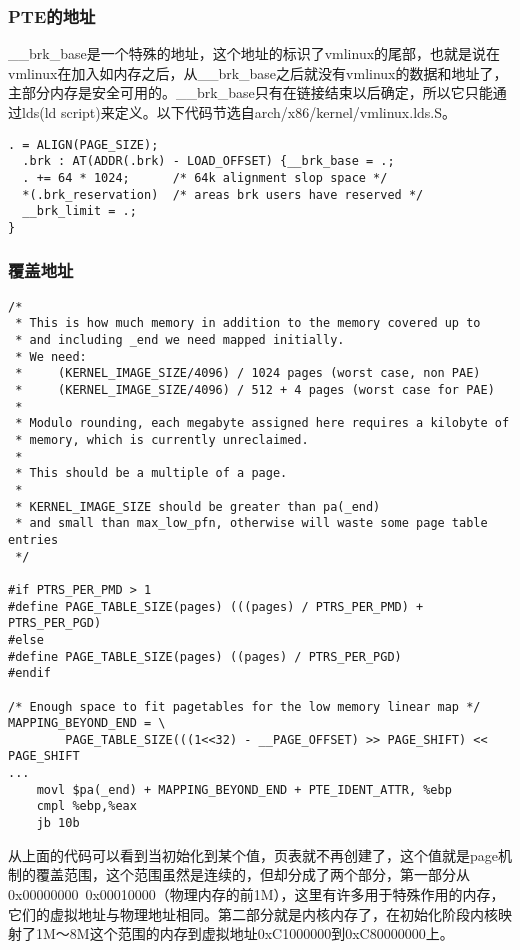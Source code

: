 \documentclass[b5paper,9pt,twoside,openany]{article}
\begin{document}
\subsubsection{PTE的地址}
\_\_brk\_base是一个特殊的地址，这个地址的标识了vmlinux的尾部，也就是说在vmlinux在加入如内存之后，从\_\_brk\_base之后就没有vmlinux的数据和地址了，主部分内存是安全可用的。\_\_brk\_base只有在链接结束以后确定，所以它只能通过lds(ld script)来定义。以下代码节选自arch/x86/kernel/vmlinux.lds.S。
\begin{lstlisting}
. = ALIGN(PAGE_SIZE);
  .brk : AT(ADDR(.brk) - LOAD_OFFSET) {__brk_base = .;
  . += 64 * 1024;      /* 64k alignment slop space */
  *(.brk_reservation)  /* areas brk users have reserved */
  __brk_limit = .;
}
\end{lstlisting}

\subsubsection{覆盖地址}
\begin{lstlisting}
/*
 * This is how much memory in addition to the memory covered up to
 * and including _end we need mapped initially.
 * We need:
 *     (KERNEL_IMAGE_SIZE/4096) / 1024 pages (worst case, non PAE)
 *     (KERNEL_IMAGE_SIZE/4096) / 512 + 4 pages (worst case for PAE)
 *
 * Modulo rounding, each megabyte assigned here requires a kilobyte of
 * memory, which is currently unreclaimed.
 *
 * This should be a multiple of a page.
 *
 * KERNEL_IMAGE_SIZE should be greater than pa(_end)
 * and small than max_low_pfn, otherwise will waste some page table entries
 */

#if PTRS_PER_PMD > 1
#define PAGE_TABLE_SIZE(pages) (((pages) / PTRS_PER_PMD) + PTRS_PER_PGD)
#else
#define PAGE_TABLE_SIZE(pages) ((pages) / PTRS_PER_PGD)
#endif

/* Enough space to fit pagetables for the low memory linear map */
MAPPING_BEYOND_END = \
        PAGE_TABLE_SIZE(((1<<32) - __PAGE_OFFSET) >> PAGE_SHIFT) << PAGE_SHIFT
... 
    movl $pa(_end) + MAPPING_BEYOND_END + PTE_IDENT_ATTR, %ebp
    cmpl %ebp,%eax
    jb 10b
\end{lstlisting}
从上面的代码可以看到当初始化到某个值，页表就不再创建了，这个值就是page机制的覆盖范围，这个范围虽然是连续的，但却分成了两个部分，第一部分从0x00000000~0x00010000（物理内存的前1M），这里有许多用于特殊作用的内存，它们的虚拟地址与物理地址相同。第二部分就是内核内存了，在初始化阶段内核映射了1M～8M这个范围的内存到虚拟地址0xC1000000到0xC80000000上。
\end{document}
